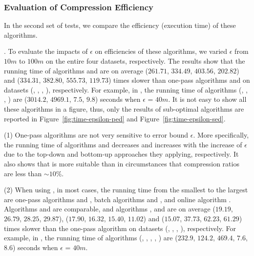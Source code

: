 \vspace{-1ex}
\subsubsection{Evaluation of Compression Efficiency}

In the second set of tests, we compare the efficiency (execution time) of these algorithms.


.
To evaluate the impacts of $\epsilon$ on efficiencies of these algorithms, we varied $\epsilon$ from $10m$ to $100m$ on the entire four datasets, respectively.
%
The results show that the running time of algorithms \optp and \nopts are on
average ($261.71$, $334.49$, $403.56$, $202.82$) and ($334.31$, $382.80$, $555.73$, $119.73$) times slower than one-pass algorithms \siped and \cised on datasets (\ucar, \geolife, \mopsi, \act), respectively. 
For example, in \mopsi, the running time of algorithms
(\optp, \nopts, \siped, \cised) are  {($3014.2$, $4969.1$, $7.5$, $9.8$)} seconds when $\epsilon$ = $40m$.
%
It is not easy to show all these algorithms in a figure, thus, only the results of sub-optimal algorithms are reported in Figure~\ref{fig:time-epsilon-ped} and Figure~\ref{fig:time-epsilon-sed}.

\sstab (1) One-pass algorithms are not very sensitive to error bound $\epsilon$. 
More specifically, the running time of algorithms \dpa and \tpa decreases and increases with the increase of $\epsilon$ due to the top-down and bottom-up approaches they applying, respectively. It also shows that \dpa is more suitable than \tpa in circumstances that compression ratios are less than $\sim 10\%$.

\sstab (2) When using \ped, in most cases, the running time from the smallest to the largest are one-pass algorithms \siped and \operb, batch algorithms \tpa and \dpa, and online algorithm \bqsa. 
Algorithms \siped and \operb are comparable, and algorithms \tpa, \dpa and \bqsa are on average
($19.19$, $26.79$, $28.25$, $29.87$), ($17.90$, $16.32$, $15.40$, $11.02$) and ($15.07$, $37.73$, $62.23$, $61.29$)
times slower than the one-pass algorithm \siped on datasets (\ucar, \geolife, \mopsi, \act), respectively.
% 
For example, in \mopsi, the running time of algorithms
(\tpa, \dpa, \bqsa, \siped, \operb ) are ($232.9$, $124.2$, $469.4$, $7.6$, $8.6$) seconds when $\epsilon$ = $40m$.


